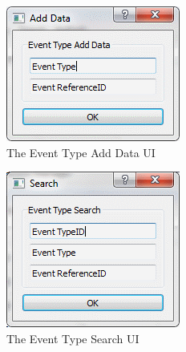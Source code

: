 \begin{figure}
\includegraphics[width=\textwidth]{./Maintenance/UI/EventTypeAD.png}
\caption{The Event Type Add Data UI} \label{fig:EventTypeAD_UI}
\end{figure}

\begin{figure}
\includegraphics[width=\textwidth]{./Maintenance/UI/EventTypeSearch.png}
\caption{The Event Type Search UI} \label{fig:EventTypeSearch_UI}
\end{figure}

